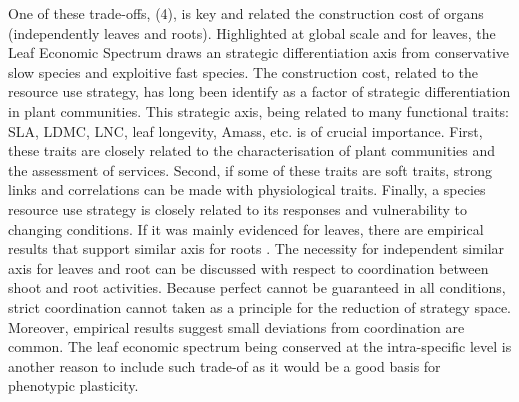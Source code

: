 One of these trade-offs, (4), is key and related the construction cost of organs (independently leaves and roots). Highlighted at global scale and for leaves, the Leaf Economic Spectrum \cite{wright_worldwide_2004} draws an strategic differentiation axis from conservative slow species and exploitive fast species. The construction cost, related to the resource use strategy, has long been identify as a factor of strategic differentiation in plant communities. This strategic axis, being related to many functional traits: SLA, LDMC, LNC, leaf longevity, Amass, etc. is of crucial importance. First, these traits are closely related to the characterisation of plant communities and the assessment of services. Second, if some of these traits are soft traits, strong links and correlations can be made with physiological traits. Finally, a species resource use strategy is closely related to its responses and vulnerability to changing conditions. If it was mainly evidenced for leaves, there are empirical results that support similar axis for roots \cite{ reich_world-wide_2014, tjoelker_linking_2015}. The necessity for independent similar axis for leaves and root can be discussed with respect to coordination between shoot and root activities. Because perfect cannot be guaranteed in all conditions, strict coordination cannot taken as a principle for the reduction of strategy space. Moreover, empirical results suggest small deviations from coordination are common. The leaf economic spectrum being conserved at the intra-specific level \cite{hu_novel_2015, freschet} is another reason to include such trade-of as it would be a good basis for phenotypic plasticity.\\

